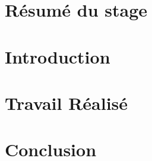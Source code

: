 \documentclass[a4paper, 12pt]{report}
\begin{document}
\begin{large}
\thispagestyle{empty}
\tableofcontents
\end{large}
\setcounter{page}{0}

\part{Résumé du stage}


\part{Introduction}




\part{Travail Réalisé}


\part{Conclusion}

\end{document}
